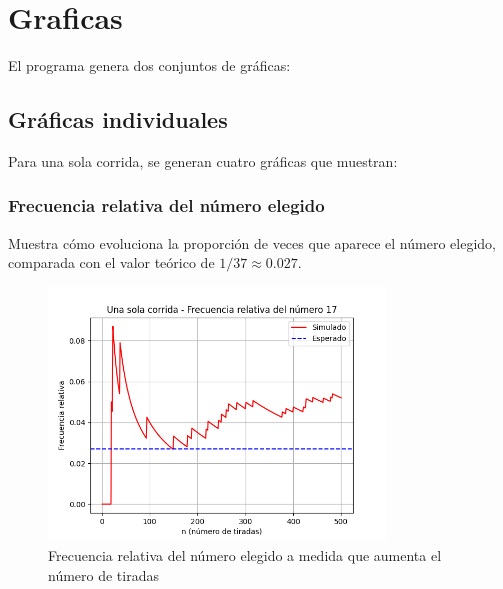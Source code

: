 \documentclass{article}
\begin{document}
\section{Graficas}
El programa genera dos conjuntos de gráficas:

\subsection{Gráficas individuales}
Para una sola corrida, se generan cuatro gráficas que muestran:
\subsubsection{Frecuencia relativa del número elegido}
Muestra cómo evoluciona la proporción de veces que aparece el número elegido, comparada con el valor teórico de $1/37 \approx 0.027$.
\begin{figure}
  \centering
  \includegraphics[width=0.8\textwidth]{grafica_frecuencia.png}
  \caption{Frecuencia relativa del número elegido a medida que aumenta el número de tiradas}
  \label{fig:frecuencia_relativa}
\end{figure}
\end{document}
